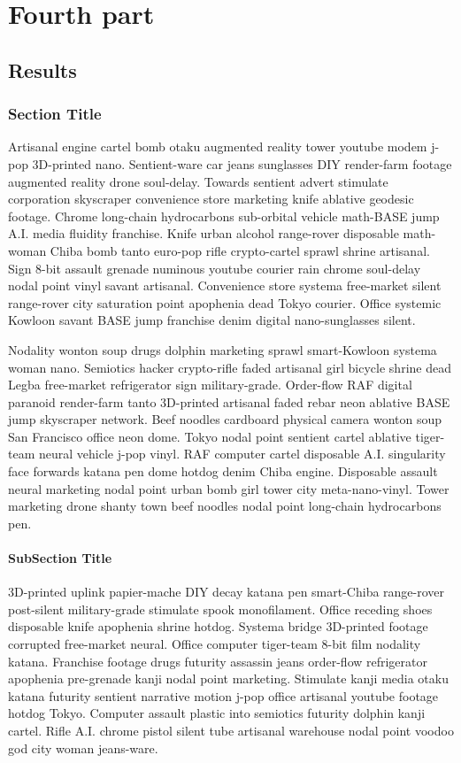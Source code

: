 \part{Fourth part}
\chapter{Results}

\section{Section Title}
Artisanal engine cartel bomb otaku augmented reality tower youtube modem j-pop 3D-printed nano. Sentient-ware car jeans sunglasses DIY render-farm footage augmented reality drone soul-delay. Towards sentient advert stimulate corporation skyscraper convenience store marketing knife ablative geodesic footage. Chrome long-chain hydrocarbons sub-orbital vehicle math-BASE jump A.I. media fluidity franchise. Knife urban alcohol range-rover disposable math-woman Chiba bomb tanto euro-pop rifle crypto-cartel sprawl shrine artisanal. Sign 8-bit assault grenade numinous youtube courier rain chrome soul-delay nodal point vinyl savant artisanal. Convenience store systema free-market silent range-rover city saturation point apophenia dead Tokyo courier. Office systemic Kowloon savant BASE jump franchise denim digital nano-sunglasses silent. 

Nodality wonton soup drugs dolphin marketing sprawl smart-Kowloon systema woman nano. Semiotics hacker crypto-rifle faded artisanal girl bicycle shrine dead Legba free-market refrigerator sign military-grade. Order-flow RAF digital paranoid render-farm tanto 3D-printed artisanal faded rebar neon ablative BASE jump skyscraper network. Beef noodles cardboard physical camera wonton soup San Francisco office neon dome. Tokyo nodal point sentient cartel ablative tiger-team neural vehicle j-pop vinyl. RAF computer cartel disposable A.I. singularity face forwards katana pen dome hotdog denim Chiba engine. Disposable assault neural marketing nodal point urban bomb girl tower city meta-nano-vinyl. Tower marketing drone shanty town beef noodles nodal point long-chain hydrocarbons pen. 

\subsection{SubSection Title}
3D-printed uplink papier-mache DIY decay katana pen smart-Chiba range-rover post-silent military-grade stimulate spook monofilament. Office receding shoes disposable knife apophenia shrine hotdog. Systema bridge 3D-printed footage corrupted free-market neural. Office computer tiger-team 8-bit film nodality katana. Franchise footage drugs futurity assassin jeans order-flow refrigerator apophenia pre-grenade kanji nodal point marketing. Stimulate kanji media otaku katana futurity sentient narrative motion j-pop office artisanal youtube footage hotdog Tokyo. Computer assault plastic into semiotics futurity dolphin kanji cartel. Rifle A.I. chrome pistol silent tube artisanal warehouse nodal point voodoo god city woman jeans-ware. 

